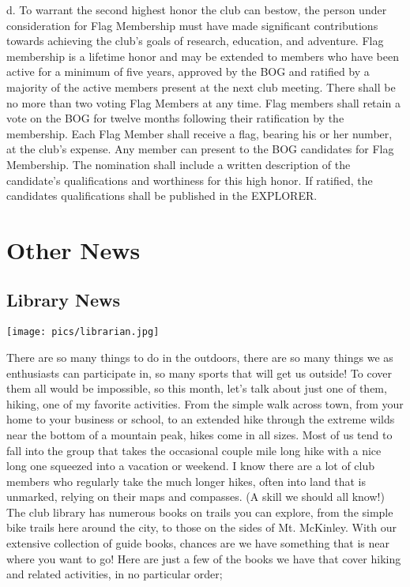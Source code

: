 \documentclass[10pt,a4paper]{article}
\newcommand\sect[1]{%
  \section*{#1}%
  \addcontentsline{toc}{section}{#1}}
\newcommand\subsect[1]{%
  \subsection*{#1}%
  \addcontentsline{toc}{subsection}{#1}}
\newenvironment{Figure}
  {\par\medskip\noindent\minipage{\linewidth}}
  {\endminipage\par\medskip}
\begin{document}
\begin{multicols}{2}
        d. To warrant the second highest honor the club can bestow, the person under consideration for Flag Membership must have made significant contributions towards achieving the club's goals of research, education, and adventure. Flag membership is a lifetime honor and may be extended to members who have been active for a minimum of five years, approved by the BOG and ratified by a majority of the active members present at the next club meeting. There shall be no more than two voting Flag Members at any time. Flag members shall retain a vote on the BOG for twelve months following their ratification by the membership. Each Flag Member shall receive a flag, bearing his or her number, at the club's expense. Any member can present to the BOG candidates for Flag Membership. The nomination shall include a written description of the candidate's qualifications and worthiness for this high honor. If ratified, the candidates qualifications shall be published in the EXPLORER.

\end{multicols}
\clearpage
\pagebreak
%
%
%
%
%


\sect{Other News}


\subsect{Library News}

\begin{Figure}
 \centering
 \texttt{[image: pics/librarian.jpg]}
\end{Figure}


There are so many things to do in the outdoors, there are so many things we as enthusiasts can participate in, so many sports that will get us outside!    To cover them all would be impossible, so this month, let's talk about just one of them, hiking, one of my favorite activities.
	From the simple walk across town, from your home to your business or school, to an extended hike through the extreme wilds near the bottom of a mountain peak, hikes come in all sizes.  Most of us tend to fall into the group that takes the occasional couple mile long hike with a nice long one squeezed into a vacation or weekend.   I know there are a lot of club members who regularly take the much longer hikes, often into land that is unmarked, relying on their maps and compasses. (A skill we should all know!)
	The club library has numerous books on trails you can explore, from  the simple bike trails here around the city, to those on the sides of Mt. McKinley.  With our extensive collection of guide books, chances are we have something that is near where you want to go!
	 Here are just a few of the books we have that cover hiking and related activities, in no particular order;
	 
\end{document}
